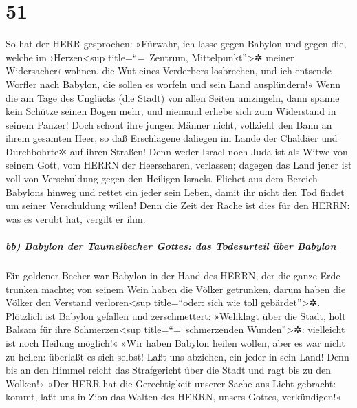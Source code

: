 \hypertarget{section-50}{%
\section{51}\label{section-50}}

So hat der HERR gesprochen: »Fürwahr, ich lasse gegen
Babylon und gegen die, welche im ›Herzen\textless sup title=``=~Zentrum,
Mittelpunkt''\textgreater✲ meiner Widersacher‹ wohnen, die Wut eines
Verderbers losbrechen, und ich entsende Worfler nach
Babylon, die sollen es worfeln und sein Land ausplündern!« Wenn die am
Tage des Unglücks (die Stadt) von allen Seiten umzingeln,
dann spanne kein Schütze seinen Bogen mehr, und niemand
erhebe sich zum Widerstand in seinem Panzer! Doch schont ihre jungen
Männer nicht, vollzieht den Bann an ihrem gesamten Heer,
so daß Erschlagene daliegen im Lande der Chaldäer und
Durchbohrte✲ auf ihren Straßen! Denn weder Israel noch
Juda ist als Witwe von seinem Gott, vom HERRN der Heerscharen,
verlassen; dagegen das Land jener ist voll von Verschuldung gegen den
Heiligen Israels. Fliehet aus dem Bereich Babylons hinweg
und rettet ein jeder sein Leben, damit ihr nicht den Tod findet um
seiner Verschuldung willen! Denn die Zeit der Rache ist dies für den
HERRN: was es verübt hat, vergilt er ihm.

\hypertarget{bb-babylon-der-taumelbecher-gottes-das-todesurteil-uxfcber-babylon}{%
\subparagraph{bb) Babylon der Taumelbecher Gottes: das Todesurteil über
Babylon}\label{bb-babylon-der-taumelbecher-gottes-das-todesurteil-uxfcber-babylon}}

Ein goldener Becher war Babylon in der Hand des HERRN, der
die ganze Erde trunken machte; von seinem Wein haben die Völker
getrunken, darum haben die Völker den Verstand verloren\textless sup
title=``oder: sich wie toll gebärdet''\textgreater✲.
Plötzlich ist Babylon gefallen und zerschmettert:
»Wehklagt über die Stadt, holt Balsam für ihre Schmerzen\textless sup
title=``=~schmerzenden Wunden''\textgreater✲: vielleicht ist noch
Heilung möglich!« »Wir haben Babylon heilen wollen, aber
es war nicht zu heilen: überlaßt es sich selbst! Laßt uns abziehen, ein
jeder in sein Land! Denn bis an den Himmel reicht das Strafgericht über
die Stadt und ragt bis zu den Wolken!« »Der HERR hat die
Gerechtigkeit unserer Sache ans Licht gebracht: kommt, laßt uns in Zion
das Walten des HERRN, unsers Gottes, verkündigen!«

